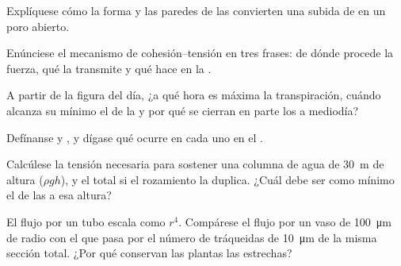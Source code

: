 \begin{exercise}[$\star$]\label{exo:b1:plant-transport:1}
Explíquese cómo la forma y las paredes de las  convierten
una subida de  en un poro abierto.
\end{exercise}

\begin{exercise}[$\star$]\label{exo:b1:plant-transport:2}
Enúnciese el mecanismo de cohesión--tensión en tres frases: de dónde procede
la fuerza, qué la transmite y qué hace en la .
\end{exercise}

\begin{exercise}[$\star$]\label{exo:b1:plant-transport:3}
A partir de la figura del día, ¿a qué hora es máxima la transpiración,
cuándo alcanza su mínimo el  de la  y por qué se
cierran en parte los  a mediodía?
\end{exercise}

\begin{exercise}[$\star$]\label{exo:b1:plant-transport:4}
Defínanse  y , y dígase qué ocurre en cada uno en el .
\end{exercise}

\begin{exercise}[$\star\star$]\label{exo:b1:plant-transport:5}
Calcúlese la tensión necesaria para sostener una columna de agua de
\qty{30}{m} de altura ($\rho g h$), y el total si el rozamiento la duplica.
¿Cuál debe ser como mínimo el  de las  a esa altura?
\end{exercise}

\begin{exercise}[$\star\star$]\label{exo:b1:plant-transport:6}
El flujo por un tubo escala como $r^4$. Compárese el flujo por un vaso de
\qty{100}{\micro m} de radio con el que pasa por el número de tráqueidas de
\qty{10}{\micro m} de la misma sección total. ¿Por qué conservan las plantas
las estrechas?
\end{exercise}

